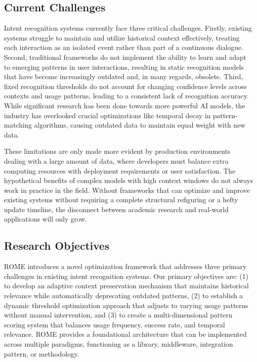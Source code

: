 \documentclass[12pt]{article}
\begin{document}
\subsection{Current Challenges}
Intent recognition systems currently face three critical challenges. Firstly, existing systems struggle to maintain and utilize historical context effectively, treating each interaction as an isolated event rather than part of a continuous dialogue. Second, traditional frameworks do not implement the ability to learn and adapt to emerging patterns in user interactions, resulting in static recognition models that have become increasingly outdated and, in many regards, obsolete. Third, fixed recognition thresholds do not account for changing confidence levels across contexts and usage patterns, leading to a consistent lack of recognition accuracy. While significant research has been done towards more powerful AI models, the industry has overlooked crucial optimizations like temporal decay in pattern-matching algorithms, causing outdated data to maintain equal weight with new data.

These limitations are only made more evident by production environments dealing with a large amount of data, where developers must balance extra computing resources with deployment requirements or user satisfaction. The hypothetical benefits of complex models with high context windows do not always work in practice in the field. Without frameworks that can optimize and improve existing systems without requiring a complete structural refiguring or a hefty update timeline, the disconnect between academic research and real-world applications will only grow.

\subsection{Research Objectives}
ROME introduces a novel optimization framework that addresses three primary challenges in existing intent recognition systems. Our primary objectives are: (1) to develop an adaptive context preservation mechanism that maintains historical relevance while automatically deprecating outdated patterns, (2) to establish a dynamic threshold optimization approach that adjusts to varying usage patterns without manual intervention, and (3) to create a multi-dimensional pattern scoring system that balances usage frequency, success rate, and temporal relevance. ROME provides a foundational architecture that can be implemented across multiple paradigms, functioning as a library, middleware, integration pattern, or methodology.
\end{document}
